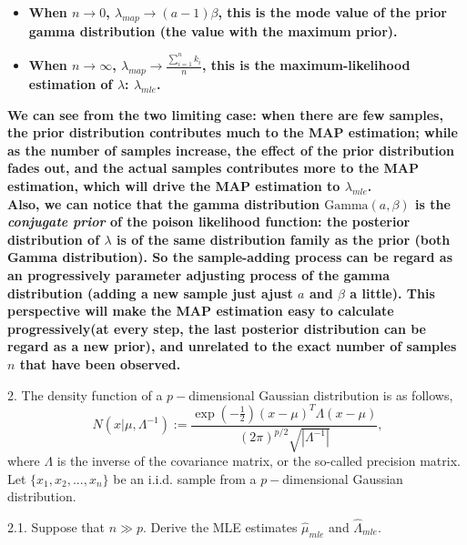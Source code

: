 \documentclass{article}
\theoremstyle{definition}
\theoremstyle{definition}
\theoremstyle{remark}
\begin{document}
\begin{addmargin}[3em]{2em}
  \begin{itemize}
  \item \textbf{When $n \rightarrow 0$, $\lambda_{map} \rightarrow (a-1)\beta$, this is the mode value of the prior gamma distribution (the value with the maximum prior).}
  \item \textbf{When $n \rightarrow \infty$, $\lambda_{map} \rightarrow \frac{\sum_{i=1}^n k_i}{n}$, this is the maximum-likelihood estimation of $\lambda$: $\lambda_{mle}$.}
  \end{itemize}
  \quad \textbf{We can see from the two limiting case: when there are few samples, the prior distribution contributes much to the MAP estimation; while as the number of samples increase, the effect of the prior distribution fades out, and the actual samples contributes more to the MAP estimation, which will drive the MAP estimation to $\lambda_{mle}$.}\\

  \quad \textbf{Also, we can notice that the gamma distribution $\mbox{Gamma}(a, \beta)$ is the \textit{conjugate prior} of the poison likelihood function: the posterior distribution of $\lambda$ is of the same distribution family as the prior (both Gamma distribution). So the sample-adding process can be regard as an progressively parameter adjusting process of the gamma distribution (adding a new sample just ajust $a$ and $\beta$ a little). This perspective will make the MAP estimation easy to calculate progressively(at every step, the last posterior distribution can be regard as a new prior), and unrelated to the exact number of samples $n$ that have been observed.}

\end{addmargin}

2. The density function of a $p-$dimensional Gaussian distribution is as follows,
\begin{equation}
~N(x|\mu,\Lambda^{-1}):=\frac{ \exp(-\frac 1 2) (x-\mu)^T\Lambda(x-\mu)} { (2\pi)^{p/2}\sqrt{|\Lambda^{-1}|} },
\end{equation}
where $\Lambda$ is the inverse of the covariance matrix,
or the so-called precision matrix. Let $\{x_1,x_2,...,x_n\}$
be an i.i.d. sample from a $p-$dimensional Gaussian distribution.

2.1. Suppose that $n\gg p$. Derive the MLE estimates
$\hat{\mu}_{mle}$ and $\hat{\Lambda}_{mle}$.
\end{document}

